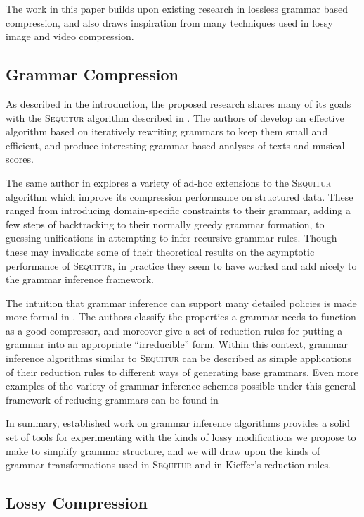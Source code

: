 \documentclass[11pt]{article}
\newcommand{\Sequitur}{\textsc{Sequitur}\xspace}
\begin{document}
The work in this paper builds upon existing research in lossless grammar based
compression, and also draws inspiration from many techniques used in lossy
image and video compression.

\subsection{Grammar Compression}

As described in the introduction, the proposed research shares many of its
goals with the \Sequitur algorithm described in \cite{sequitur}.  The authors
of \cite{sequitur} develop an effective algorithm based on iteratively
rewriting grammars to keep them small and efficient, and produce interesting
grammar-based analyses of texts and musical scores.

The same author in \cite{nevillphd} explores a variety of ad-hoc extensions to
the \Sequitur algorithm which improve its compression performance on structured
data.  These ranged from introducing domain-specific constraints to their
grammar, adding a few steps of backtracking to their normally greedy grammar
formation, to guessing unifications in attempting to infer recursive grammar
rules.  Though these may invalidate some of their theoretical results on the
asymptotic performance of \Sequitur, in practice they seem to have worked and
add nicely to the grammar inference framework.

The intuition that grammar inference can support many detailed policies is made
more formal in \cite{grammarcodes}.  The authors classify the properties a
grammar needs to function as a good compressor, and moreover give a set of
reduction rules for putting a grammar into an appropriate ``irreducible'' form.
Within this context, grammar inference algorithms similar to \Sequitur can be
described as simple applications of their reduction rules to different ways of
generating base grammars.  Even more examples of the variety of grammar
inference schemes possible under this general framework of reducing grammars
can be found in \cite{efficientgreedy}

In summary, established work on grammar inference algorithms provides a solid
set of tools for experimenting with the kinds of lossy modifications we propose
to make to simplify grammar structure, and we will draw upon the kinds of
grammar transformations used in \Sequitur and in Kieffer's reduction rules.

\subsection{Lossy Compression}
\end{document}
